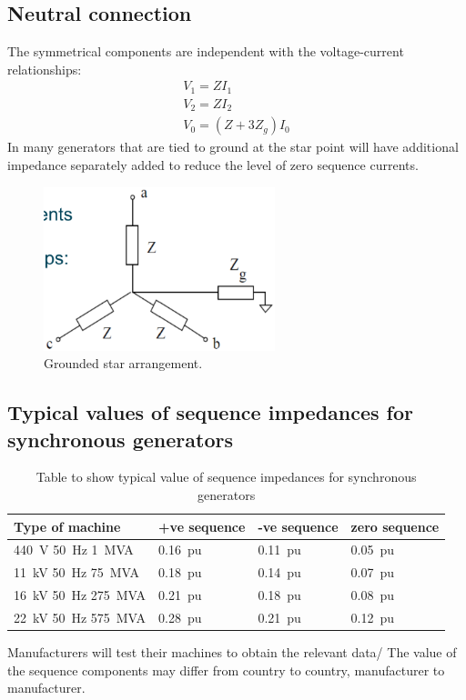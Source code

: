 \documentclass[class=report, crop=false, 12pt,a4paper]{standalone}
\begin{document}
\subsection{Neutral connection}
The symmetrical components are independent with the voltage-current relationships:
\begin{gather}
	V_1 = ZI_1\\
	V_2 = ZI_2\\
	V_0 = \left(Z + 3Z_g\right)I_0
\end{gather}
In many generators that are tied to ground at the star point will have additional impedance separately added to reduce the level of zero sequence currents.
\begin{figure}[H]
	\centering
	\includegraphics[width = 0.6\textwidth]{../img/figure34.png}
	\caption{Grounded star arrangement.}
\end{figure}
\subsection{Typical values of sequence impedances for synchronous generators}
\begin{table}
	\centering
	\begin{tabular}{@{}llll@{}}
		\toprule
		Type of machine & +ve sequence & -ve sequence & zero sequence\\
		\midrule
		\SI{440}{V} \SI{50}{\hertz} \SI{1}{MVA} & \SI{0.16}{pu} & \SI{0.11}{pu} & \SI{0.05}{pu}\\
		\SI{11}{kV} \SI{50}{\hertz} \SI{75}{MVA} & \SI{0.18}{pu} & \SI{0.14}{pu} & \SI{0.07}{pu}\\ 
		\SI{16}{kV} \SI{50}{\hertz} \SI{275}{MVA} & \SI{0.21}{pu} & \SI{0.18}{pu} & \SI{0.08}{pu}\\ 
		\SI{22}{kV} \SI{50}{\hertz} \SI{575}{MVA} & \SI{0.28}{pu} & \SI{0.21}{pu} & \SI{0.12}{pu}\\
		\bottomrule
	\end{tabular}
	\caption{Table to show typical value of sequence impedances for synchronous generators}
\end{table}
Manufacturers will test their machines to obtain the relevant data/ The value of the sequence components may differ from country to country, manufacturer to manufacturer. 
\end{document}
